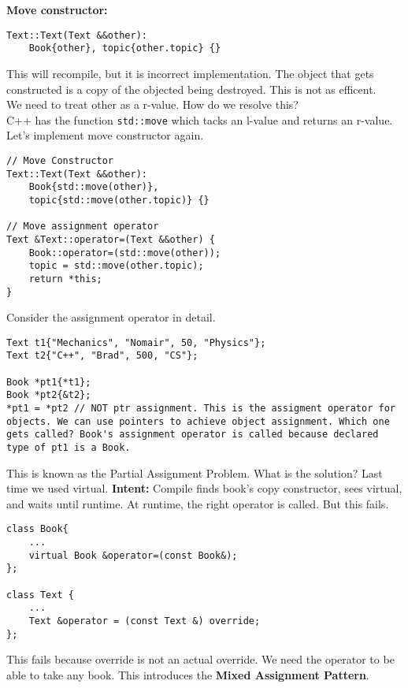 \documentclass[12pt]{article}
\begin{document}
\textbf{Move constructor:}
\begin{lstlisting}
Text::Text(Text &&other):
    Book{other}, topic{other.topic} {}
\end{lstlisting}
This will recompile, but it is incorrect implementation. The object that gets constructed is a copy of the objected being destroyed. This is not as efficent.
\\ We need to treat other as a r-value.
How do we resolve this?
\\ C++ has the function \lstinline{std::move} which tacks an l-value and returns an r-value.
Let's implement move constructor again.
\begin{lstlisting}
// Move Constructor
Text::Text(Text &&other):
    Book{std::move(other)},
    topic{std::move(other.topic)} {}

// Move assignment operator
Text &Text::operator=(Text &&other) {
    Book::operator=(std::move(other));
    topic = std::move(other.topic);
    return *this;
}
\end{lstlisting}
Consider the assignment operator in detail.
\begin{lstlisting}
Text t1{"Mechanics", "Nomair", 50, "Physics"};
Text t2{"C++", "Brad", 500, "CS"};

Book *pt1{*t1};
Book *pt2{&t2};
*pt1 = *pt2 // NOT ptr assignment. This is the assigment operator for objects. We can use pointers to achieve object assignment. Which one gets called? Book's assignment operator is called because declared type of pt1 is a Book.
\end{lstlisting}
This is known as the Partial Assignment Problem. What is the solution? Last time we used virtual.
\textbf{Intent:} Compile finds book's copy constructor, sees virtual, and waits until runtime. At runtime, the right operator is called. But this fails.
\begin{lstlisting}
class Book{
    ...
    virtual Book &operator=(const Book&);
};

class Text {
    ... 
    Text &operator = (const Text &) override;
};
\end{lstlisting}
This fails because override is not an actual override. We need the operator to be able to take any book. This introduces the \textbf{Mixed Assignment Pattern}.
\end{document}
